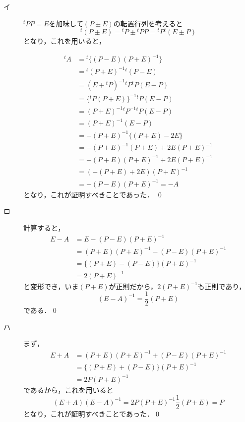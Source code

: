 \documentclass[uplatex,dvipdfmx,a4paper,11pt,fleqn]{jsarticle}
\begin{document}
\begin{leftbar}
    \begin{description}
        \item[イ] ${}^t PP =E$を加味して$(P \pm E)$の転置行列を考えると
        \[
           {}^t (P \pm E) = {}^t P \pm {}^t PP = {}^t P {}^t (E \pm P)
        \]
        となり，これを用いると，

        \begin{align*} 
            {}^t A & ={}^t  \{ (P-E)(P+E)^{-1} \} \\
            & = {}^t (P+E)^{-1} {}^t (P-E) \\
            & = (E+{}^t P)^{-1} {}^t P {}^t P (E-P) \\
            & = \{ {}^t P (P+E)  \}^{-1} {}^t P (E-P) \\
            & = (P+E)^{-1} {}^t P^{-1} {}^t P (E-P) \\
            & = (P+E)^{-1} (E-P) \\
            & = -(P+E)^{-1} \{ (P+E)-2E \} \\
            & = -(P+E)^{-1} (P+E) +2E (P+E)^{-1} \\
            & = -(P+E) (P+E)^{-1} +2E (P+E)^{-1} \\
            & = (-(P+E)+2E) (P+E)^{-1} \\
            & = -(P-E) (P+E)^{-1} = -A
        \end{align*} 
        となり，これが証明すべきことであった． \qed
        \item[ロ] 計算すると，
        \begin{align*} 
            E-A & = E-(P-E) (P+E)^{-1} \\
            & = (P+E)(P+E)^{-1} - (P-E) (P+E)^{-1} \\
            & = \{ (P+E)-(P-E) \} (P+E)^{-1} \\
            & = 2(P+E)^{-1}
        \end{align*} 
        と変形でき，いま$(P+E)$が正則だから，$2(P+E)^{-1}$も正則であり，
        \[
            (E-A)^{-1} = \frac{1}{2} (P+E)
        \]
        である．\qed
        \item[ハ] まず，
        \begin{align*}
            E+A &=(P+E)(P+E)^{-1}+(P-E) (P+E)^{-1} \\
            & = \{ (P+E)+(P-E) \} (P+E)^{-1} \\
            & = 2P (P+E)^{-1}
        \end{align*}
        であるから，これを用いると
        \[
            (E+A)(E-A)^{-1} = 2P (P+E)^{-1} \frac{1}{2} (P+E) =P
        \]
        となり，これが証明すべきことであった．\qed 
    \end{description}
\end{leftbar}
\newpage 
\end{document}
